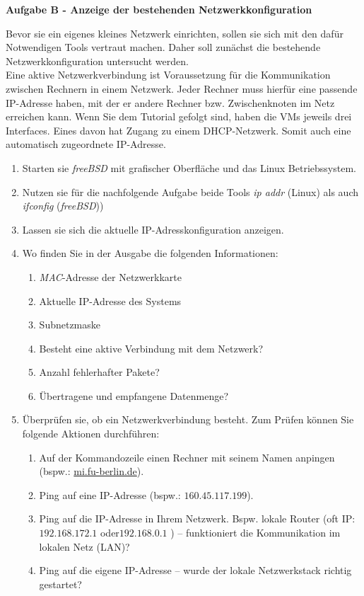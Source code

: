 \documentclass[paper=a4,fontsize=11pt]{scrartcl}%
\begin{document}
\begin{center}
\Large{\textbf{Aufgabe B - Anzeige der bestehenden Netzwerkkonfiguration}}
\end{center}
Bevor sie ein eigenes kleines Netzwerk einrichten, sollen sie sich mit den dafür Notwendigen Tools vertraut machen. Daher soll zunächst die bestehende Netzwerkkonfiguration untersucht werden.\\
Eine aktive Netzwerkverbindung ist Voraussetzung für die Kommunikation zwischen Rechnern in einem Netzwerk. Jeder Rechner muss hierfür eine passende IP-Adresse haben, mit der er andere Rechner bzw. Zwischenknoten im Netz erreichen kann. Wenn Sie dem Tutorial gefolgt sind, haben die VMs jeweils drei Interfaces. Eines davon hat Zugang zu einem DHCP-Netzwerk. Somit auch eine automatisch zugeordnete IP-Adresse.
\begin{enumerate}
	\item Starten sie \emph{freeBSD} mit grafischer Oberfläche und das Linux Betriebssystem. 
	\item Nutzen sie für die nachfolgende Aufgabe beide Tools \emph{ip addr} (Linux) als auch \emph{ifconfig} (\emph{freeBSD}))
	\item Lassen sie sich die aktuelle IP-Adresskonfiguration anzeigen.
	\item Wo finden Sie in der Ausgabe die folgenden Informationen:
	\begin{enumerate}
		\item \emph{MAC}-Adresse der Netzwerkkarte
		\item Aktuelle IP-Adresse des Systems
		\item Subnetzmaske
		\item Besteht eine aktive Verbindung mit dem Netzwerk?
		\item Anzahl fehlerhafter Pakete?
		\item Übertragene und empfangene Datenmenge?
	\end{enumerate}
	\item Überprüfen sie, ob ein Netzwerkverbindung besteht. Zum Prüfen können Sie folgende Aktionen durchführen:
	\begin{enumerate}
		\item Auf der Kommandozeile einen Rechner mit seinem Namen anpingen (bspw.: \url{mi.fu-berlin.de}).
		\item Ping auf eine IP-Adresse (bspw.: $160.45.117.199$).
		\item Ping auf die IP-Adresse in Ihrem Netzwerk. Bspw. lokale Router (oft IP: $192.168.172.1$ oder$192.168.0.1$ ) -- funktioniert die Kommunikation im lokalen Netz (LAN)?
		\item Ping auf die eigene IP-Adresse -- wurde der lokale Netzwerkstack richtig gestartet?
	\end{enumerate}
\end{enumerate}
\end{document}
